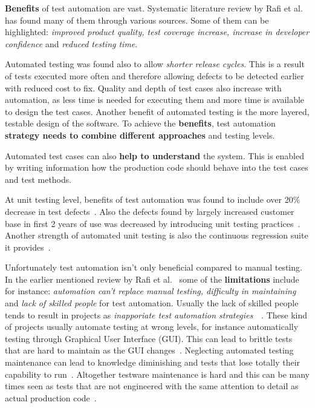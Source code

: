     \textbf{Benefits} of test automation are vast. Systematic literature review by Rafi et al.~\cite{rafi2012benefits} has found many
    of them through various sources. Some of them can be highlighted: \textit{improved product quality, test coverage increase,
    increase in developer confidence} and \textit{reduced testing time}.

    Automated testing was found also to allow \textit{shorter release cycles}. This is a result of
    tests executed more often and therefore allowing defects to be detected earlier with reduced cost to fix.
    Quality and depth of test cases also increase with automation, as less time is needed for executing them and more time is available
    to design the test cases. Another benefit of automated testing is the more layered, testable design of the software.
    To achieve the \textbf{benefits}, test automation \textbf{strategy needs to combine different approaches} and testing levels. ~\cite{berner2005observations}

    Automated test cases can also \textbf{help to understand} the system. This is enabled by writing information how the production code should behave
    into the test cases and test methods. ~\cite{langr2015pragmatic}~\cite{chelimsky2010rspec}~\cite{kapelonis2016java}

    At unit testing level, benefits of test automation was found to include over 20\% decrease in test defects~\cite{williams2009effectiveness}.
    Also the defects found by largely increased customer base in first 2 years of use was decreased by introducing unit testing practices~\cite{williams2009effectiveness}.
    Another strength of automated unit testing is also the continuous regression suite it provides~\cite{runeson2006survey}.

    Unfortunately test automation isn't only beneficial compared to manual testing. In the earlier mentioned review by Rafi et al.~\cite{rafi2012benefits}
    some of the \textbf{limitations} include for instance: \textit{automation can't replace manual testing, difficulty in maintaining}
    and \textit{lack of skilled people} for test automation. Usually the lack of skilled people tends to result in projects as
    \textit{inapporiate test automation strategies}~\cite{rafi2012benefits}~\cite{berner2005observations}. These kind of projects
    usually automate testing at wrong levels, for instance automatically testing through Graphical User Interface (GUI). This
    can lead to brittle tests that are hard to maintain as the GUI changes~\cite{berner2005observations}. Neglecting automated
    testing maintenance can lead to knowledge diminishing and tests that lose totally their capability to run~\cite{berner2005observations}.
    Altogether testware maintenance is hard and this can be many times seen as tests that are not engineered
    with the same attention to detail as actual production code~\cite{berner2005observations}.

